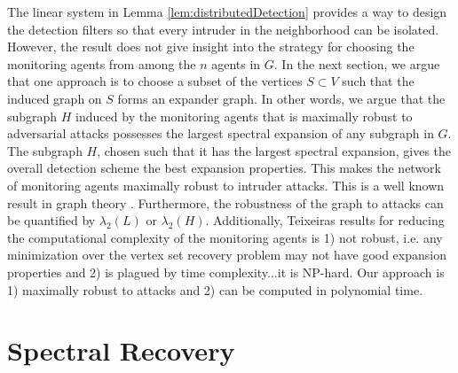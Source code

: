 \documentclass{amsart}
\theoremstyle{definition}
\theoremstyle{remark}
\numberwithin{equation}{section}
\begin{document}
The linear system in Lemma \ref{lem:distributedDetection} provides a way to design the detection filters so that every intruder in the neighborhood can be isolated. However, the result does not give insight into the strategy for choosing the monitoring agents from among the $n$ agents in $G$. In the next section, we argue that one approach is to choose a subset of the vertices $S \subset V$ such that the induced graph on $S$ forms an expander graph. In other words, we argue that the subgraph $H$ induced by the monitoring agents that is maximally robust to adversarial attacks possesses the largest spectral expansion of any subgraph in $G$. The subgraph $H$, chosen such that it has the largest spectral expansion, gives the overall detection scheme the best expansion properties. This makes the network of monitoring agents maximally robust to intruder attacks. This is a well known result in graph theory \cite{Wig2006,Lub2012,Lub1988}. Furthermore, the robustness of the graph to attacks can be quantified by $\lambda_2 (L)$ or $\lambda_2 (H)$. Additionally, Teixeiras results for reducing the computational complexity of the monitoring agents is 1) not robust, i.e. any minimization over the vertex set recovery problem may not have good expansion properties and 2) is plagued by time complexity...it is NP-hard. Our approach is 1) maximally robust to attacks and 2) can be computed in polynomial time.  
\section{Spectral Recovery}
\end{document}

